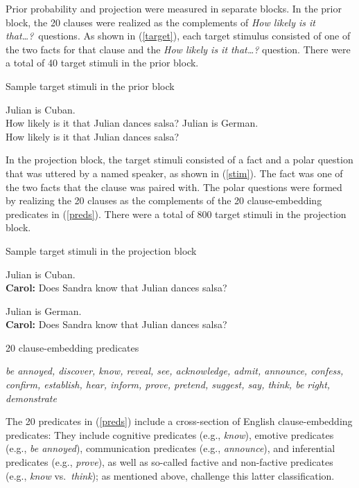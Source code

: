 \documentclass[11pt,fleqn]{article}
\newcommand{\6}{\mbox{$[\hspace*{-.6mm}[$}}
\newcommand{\9}{\mbox{$]\hspace*{-.6mm}]$}}
\begin{document}
Prior probability and projection were measured in separate blocks. In the prior block, the 20 clauses were realized as the complements of {\em How likely is it that\ldots?}~questions. As shown in (\ref{target}), each target stimulus consisted of one of the two facts for that clause and the {\em How likely is it that\ldots?} question. There were a total of 40 target stimuli in the prior block.

\begin{exe}
\ex\label{target}  Sample target stimuli in the prior block
\begin{xlist}
 Julian is Cuban. \\ How likely is it that Julian dances salsa?
 Julian is German.  \\ How likely is it that Julian dances salsa?
\end{xlist}
\end{exe}

In the projection block, the target stimuli consisted of a fact and a polar question that was uttered by a named speaker, as shown in (\ref{stim}). The fact was one of the two facts that the clause was paired with. The polar questions were formed by realizing the 20 clauses as the complements of the 20 clause-embedding predicates in (\ref{preds}).  There were a total of 800 target stimuli in the projection block.

\begin{exe}
\ex\label{stim} Sample target stimuli in the projection block
\begin{xlist}
 Julian is Cuban.  \\ 
{\bf Carol:} Does Sandra know that Julian dances salsa?

 Julian is German.  \\ 
{\bf Carol:} Does Sandra know that Julian dances salsa?
\end{xlist}
\end{exe}

\begin{exe}
\ex\label{preds} 20 clause-embedding predicates 

{\em be annoyed, discover, know, reveal, see, acknowledge, admit, announce, confess, confirm, establish, hear, inform, prove, pretend, suggest, say, think, be right, demonstrate}
\end{exe}
The 20 predicates in (\ref{preds}) include a cross-section of English clause-embedding predicates: They include cognitive predicates (e.g., {\em know}), emotive predicates (e.g., {\em be annoyed}), communication predicates (e.g., {\em announce}), and inferential predicates (e.g., {\em prove}), as well as so-called factive and non-factive predicates (e.g., {\em know} vs.\ {\em think}); as mentioned above, \citealt{tonhauser-degen-factive} challenge this latter classification.
\end{document}
